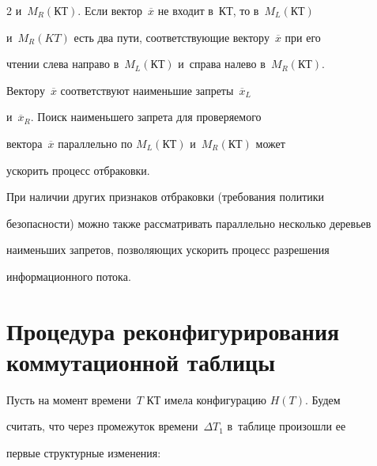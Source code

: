 \begin{multicols}{2}
и~$M_R(\mathrm{КТ})$. Если вектор~$\overline{x}$ не входит в~КТ, то в~$M_L(\mathrm{КТ})$ 


и~$M_R(KT)$ есть два пути, соответствующие вектору~$\overline{x}$ при его 


чтении слева направо в~$M_L(\mathrm{КТ})$ и~справа налево в~$M_R(\mathrm{КТ})$. 


Вектору~$\overline{x}$ соответствуют наименьшие запреты~$\overline{x}_L$ 


и~$\overline{x}_R$. Поиск наименьшего запрета для проверяемого 


вектора~$\overline{x}$ параллельно по $M_L(\mathrm{КТ})$ и~$M_R(\mathrm{КТ})$ может 


ускорить процесс отбраковки. 


  


  При наличии других признаков отбраковки (требования политики 


безопасности) можно также рассматривать параллельно несколько деревьев 


наименьших запретов, позволяющих ускорить процесс разрешения 


информационного потока.





\vspace*{-8pt} 


  


\section{Процедура реконфигурирования коммутационной таблицы}





\vspace*{-2pt}


  


  Пусть на момент времени~$T$ КТ имела конфигурацию $H(T)$. Будем 


считать, что через промежуток времени~$\Delta T_1$ в~таблице произошли ее 


первые структурные изменения:


\end{multicols}
